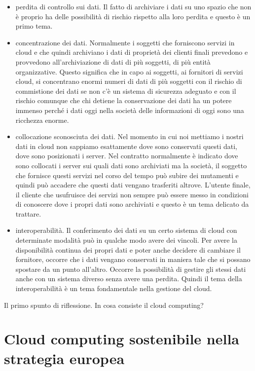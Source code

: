 \begin{itemize}
    \item perdita di controllo sui dati. Il fatto di archiviare i dati su uno spazio che non è proprio ha delle possibilità di rischio rispetto alla loro perdita e questo è un primo tema.
    \item  concentrazione dei dati. Normalmente i soggetti che forniscono servizi in cloud e che quindi archiviano i dati di proprietà dei clienti finali prevedono e provvedono all'archiviazione di dati di più soggetti, di più entità organizzative. Questo significa che in capo ai soggetti, ai fornitori di servizi cloud, si concentrano enormi numeri di dati di più soggetti con il rischio di commistione dei dati se non c'è un sistema di sicurezza adeguato e con il rischio comunque che chi detiene la conservazione dei dati ha un potere immenso perché i dati oggi nella società delle informazioni di oggi sono una ricchezza enorme.
    \item collocazione sconosciuta dei dati. Nel momento in cui noi mettiamo i nostri dati in cloud non sappiamo esattamente dove sono conservati questi dati, dove sono posizionati i server. Nel contratto normalmente è indicato dove sono collocati i server sui quali dati sono archiviati ma la società, il soggetto che fornisce questi servizi nel corso del tempo può subire dei mutamenti e quindi può accadere che questi dati vengano trasferiti altrove. L'utente finale, il cliente che usufruisce dei servizi non sempre può essere messo in condizioni di conoscere dove i propri dati sono archiviati e questo è un tema delicato da trattare. 
    \item  interoperabilità. Il conferimento dei dati su un certo sistema di cloud con determinate modalità può in qualche modo avere dei vincoli. Per avere la disponibilità continua dei propri dati e poter anche decidere di cambiare il fornitore, occorre che i dati vengano conservati in maniera tale che si possano spostare da un punto all'altro. Occorre la possibilità di gestire gli stessi dati anche con un sistema diverso senza avere una perdita. Quindi il tema della interoperabilità è un tema fondamentale nella gestione del cloud.
\end{itemize}

Il primo spunto di riflessione. In cosa consiste il cloud computing? 

\section{Cloud computing sostenibile nella strategia europea}

